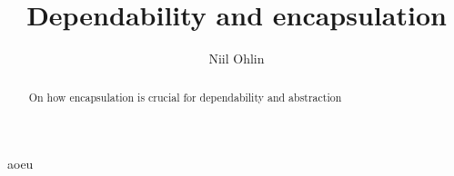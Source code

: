\documentclass[a4paper, 12pt]{article}
\begin{document}
	\title{Dependability and encapsulation}
	\author{Niil Ohlin}
	\date{}
	\maketitle

	\begin{abstract}
		On how encapsulation is crucial for dependability and abstraction
	\end{abstract}
	aoeu
\end{document}
